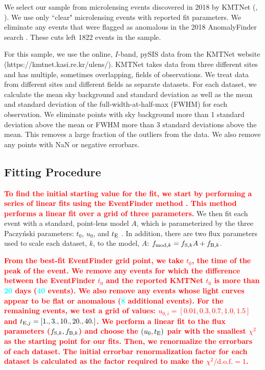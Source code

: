 \documentclass[preprint]{aastex631}
\newcommand{\HL}[1]{\textcolor{red}{\bf#1}}
\newcommand{\num}[1]{\textcolor{cyan}{\bf#1}}
\begin{document}
We select  our sample from microlensing events discovered in 2018 by KMTNet (\citealt{KimKim18_EF}, \citealt{Kim18EF,Kim18_AF}). We use only ``clear" microlensing events with reported fit parameters. We eliminate any events that were flagged as anomalous in the 2018 AnomalyFinder search \citep[although possible finite source or buried host events were left in the sample;][]{Gould22AF5,Jung22AF6}. These cuts left 1822 events in the sample. 

For this sample, we use the online, $I$-band, pySIS \citep{Albrow09} data  from the KMTNet website (https://kmtnet.kasi.re.kr/ulens/). KMTNet takes data from three different sites and has multiple, sometimes overlapping, fields of observations. We treat data from different sites and different fields as separate datasets. For each dataset, we calculate the mean sky background and standard deviation as well as the mean and standard deviation of the full-width-at-half-max (FWHM) for each observation. We eliminate points with sky background more than 1 standard deviation above the mean or FWHM more than 3 standard deviations above the mean. This removes a large fraction of the outliers from the data. We also remove any points with NaN or negative errorbars.

\subsection{Fitting Procedure}

\HL{To find the initial starting value for the fit, we start by performing a series of linear fits using the EventFinder method \citep{KimKim18_EF, Kim18EF}. This method performs a linear fit over a grid of three parameters.}
We then fit each event with a standard, point-lens model $A$, which is parameterized by the three Paczy\'{n}ski parameters: $t_0$, $u_0$, and $t_{\rm E}$ \citep[for the definitions of these parameters see, e.g.,][]{Gaudi12}. In addition, there are two flux parameters used to scale each dataset, $k$, to the model, $A$: 
$f_{{\rm mod}, k} = f_{{\rm S}, k} A + f_{{\rm B}, k}$.

\HL{From the best-fit EventFinder grid point, we take $t_0$, the time of the peak of the event. We remove any events for which the difference between the EventFinder $t_0$ and the reported KMTNet $t_0$ is more than \num{20} days (\num{40} events). We also remove any events whose light curves appear to be flat or anomalous (\num{8} additional events).
For the remaining events, we test a grid of values: $u_{0, i} = [0.01, 0.3, 0.7, 1.0, 1.5]$ and $t_{{\rm E}, j}=[1., 3., 10., 20., 40.]$. We perform a linear fit to the flux parameters  ($f_{{\rm S}, k}, f_{{\rm B}, k}$) and choose the $(u_0, t_{\rm E})$ pair with the smallest $\chi^2$ as the starting point for our fits.  Then, we renormalize the errorbars of each dataset. The initial errorbar renormalization factor for each dataset is calculated as the factor required to make the $\chi^2/\mathrm{d.o.f.} = 1$.}
\end{document}
